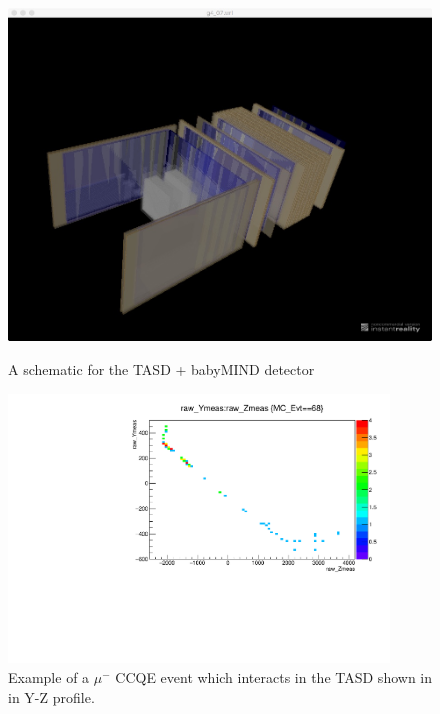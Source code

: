 \begin{figure}[h!]
	\begin{minipage}{0.49\linewidth}
		\centerline{\includegraphics[width=0.9\linewidth]{figures/mindSide.jpeg}}
			\caption[]{A schematic for the TASD + babyMIND detector}
		\label{fig:schematic}
	\end{minipage}
	\hfill
	\begin{minipage}{0.49\linewidth}
		\centerline{\includegraphics[width=0.9\textwidth]{figures/muCCQEorigin.pdf}}
		\caption[]{Example of a $\mu^{-}$ CCQE event which interacts in the TASD shown in in Y-Z profile. }
		\label{fig:event}
	\end{minipage}
\end{figure}



